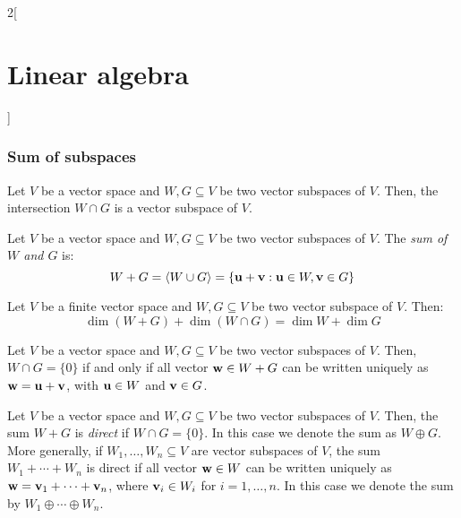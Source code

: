 \documentclass[../../../main.tex]{subfiles}
\begin{document}
\begin{multicols}{2}[\section{Linear algebra}]
  \subsubsection*{Sum of subspaces}
  \begin{lemma}
    Let $V$ be a vector space and $W,G\subseteq V$ be two vector subspaces of $V$. Then, the intersection $W\cap G$ is a vector subspace of $V$.
  \end{lemma}
  \begin{definition}
    Let $V$ be a vector space and $W,G\subseteq V$ be two vector subspaces of $V$. The \textit{sum of $W$ and $G$} is: $$W+G=\langle W\cup G\rangle=\{\vb{u}+\vb{v}: \vb{u}\in W,\vb{v}\in G\}$$
  \end{definition}
  \begin{prop}
    Let $V$ be a finite vector space and $W,G\subseteq V$ be two vector subspace of $V$. Then: $$\dim (W+G)+\dim(W\cap G)=\dim W+\dim G$$
  \end{prop}
  \begin{lemma}
    Let $V$ be a vector space and $W,G\subseteq V$ be two vector subspaces of $V$. Then, $W\cap G=\{0\}$ if and only if all vector $\vb{w}\in W+G$ can be written uniquely as $\vb{w}=\vb{u}+\vb{v}$, with $\vb{u}\in W$ and $\vb{v}\in G$.
  \end{lemma}
  \begin{definition}
    Let $V$ be a vector space and $W,G\subseteq V$ be two vector subspaces of $V$. Then, the sum $W+G$ is \textit{direct} if $W\cap G=\{0\}$. In this case we denote the sum as $W\oplus G$. More generally, if $W_1,\ldots,W_n\subseteq V$ are vector subspaces of $V$, the sum $W_1+\cdots+W_n$ is direct if all vector $\vb{w}\in W$ can be written uniquely as $\vb{w}=\vb{v}_1+\cdots+\vb{v}_n$, where $\vb{v}_i\in W_i$ for $i=1,\ldots,n$. In this case we denote the sum by $W_1\oplus\cdots\oplus W_n$.
  \end{definition}

\end{multicols}
\end{document}
